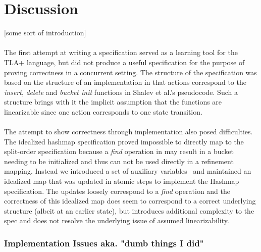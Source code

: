 \documentclass{uit-thesis}
\begin{document}
\chapter{Discussion}\label{ch:discussion}
[some sort of introduction]
\\\\
The first attempt at writing a specification served as a learning tool for the TLA+ language, but did not produce a useful specification for the purpose of proving correctness in a concurrent setting. The structure of the specification was based on the structure of an implementation in that actions correspond to the \textit{insert}, \textit{delete} and \textit{bucket init} functions in Shalev et al.'s pseudocode. Such a structure brings with it the implicit assumption that the functions are linearizable since one action corresponds to one state transition.
\\\\
The attempt to show correctness through implementation also posed difficulties. The idealized hashmap specification proved impossible to directly map to the split-order specification because a \textit{find} operation in may result in a bucket needing to be initialized and thus can not be used directly in a refinement mapping. Instead we introduced a set of auxiliary variables~\cite{Lamport2019a} and maintained an idealized map that was updated in atomic steps to implement the Hashmap specification. The updates loosely correspond to a \textit{find} operation and the correctness of this idealized map does seem to correspond to a correct underlying structure (albeit at an earlier state), but introduces additional complexity to the spec and does not resolve the underlying issue of assumed linearizability.
\subsection{Implementation Issues aka. "dumb things I did"}
\backmatter
\printbibliography{}
\appendix
{}
\end{document}
